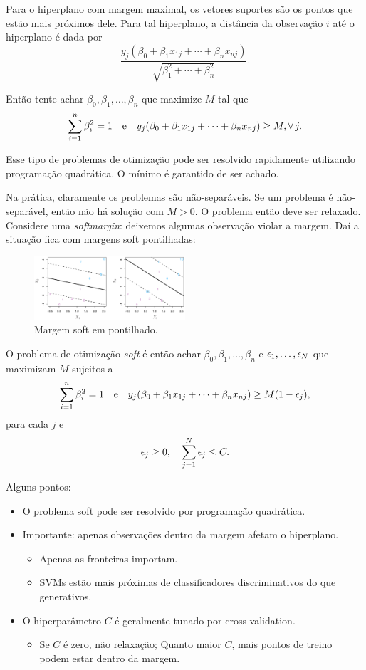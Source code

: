 \documentclass[a4paper,fleqn,12pt]{article}
\begin{document}
Para o hiperplano com margem maximal, os vetores suportes são os pontos que estão mais próximos dele. Para tal hiperplano, a distância da observação $i$ até o hiperplano é dada por
$$
\frac{y_j(\beta_0 + \beta_1 x_{1j} + \cdots + \beta_n x_{nj})}{\sqrt{\beta_1^2 + \cdots + \beta_n^2}}.
$$

Então tente achar $\beta_0, \beta_1, \ldots, \beta_n$ que maximize $M$ tal que
$$
\sum_{i=1}^n \beta_i^2 = 1 \quad \mathrm{e} \quad
y_j(\beta_0 + \beta_1 x_{1j} + \cdots + \beta_n x_{nj}) \geq M, \forall \, j.
$$

Esse tipo de problemas de otimização pode ser resolvido rapidamente utilizando programação quadrática. O mínimo é garantido de ser achado.

Na prática, claramente os problemas são não-separáveis. Se um problema é não-separável, então não há solução com $M > 0$. O problema então deve ser relaxado. Considere uma \textit{softmargin}: deixemos algumas observação violar a margem. Daí a situação fica com margens soft pontilhadas:
\begin{figure}[H]
\centering
\includegraphics[width=0.5\textwidth]{fig/soft-margin.png}
\caption{Margem soft em pontilhado.}
\label{fig:soft-margin}
\end{figure}

O problema de otimização \textit{soft} é então achar $\beta_0, \beta_1, \ldots, \beta_n$ e $\epsilon_1, \ldots, \epsilon_N$ que maximizam $M$ sujeitos a
$$
\sum_{i=1}^n \beta_i^2 = 1 \quad \mathrm{e} \quad
y_j(\beta_0 + \beta_1 x_{1j} + \cdots + \beta_n x_{nj}) \geq M (1-\epsilon_j),
$$
para cada $j$ e
$$
\epsilon_j \geq 0, \quad \sum_{j=1}^N \epsilon_j \leq C.
$$

Alguns pontos:
\begin{itemize}
\item O problema soft pode ser resolvido por programação quadrática.
\item Importante: apenas observações dentro da margem afetam o hiperplano.
\begin{itemize}
\item Apenas as fronteiras importam.
\item SVMs estão mais próximas de classificadores discriminativos do que generativos.
\end{itemize}
\item O hiperparâmetro $C$ é geralmente tunado por cross-validation.
\begin{itemize}
\item Se $C$ é zero, não relaxação; Quanto maior $C$, mais pontos de treino podem estar dentro da margem.
\end{itemize}
\end{itemize}
\end{document}
